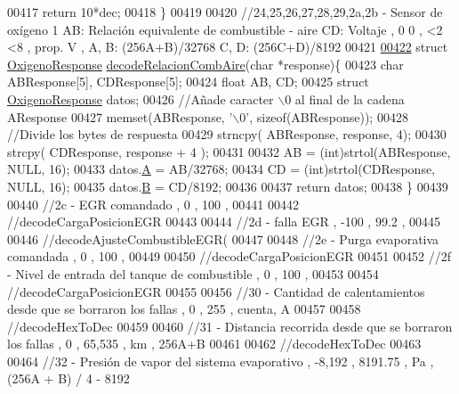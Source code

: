 \begin{DoxyCode}
{{{00417     \textcolor{keywordflow}{return} 10*dec;
00418 \}
00419 
00420 \textcolor{comment}{//24,25,26,27,28,29,2a,2b - Sensor de oxígeno 1 AB: Relación equivalente de combustible - aire CD: Voltaje
       , 0 0 , <2 <8 , prop. V , A, B: (256A+B)/32768 C, D: (256C+D)/8192   }
00421 
\hyperlink{decoders_8hpp_a363bd4f505969098be58a175f02b9b50}{00422} \textcolor{keyword}{struct }\hyperlink{structOxigenoResponse}{OxigenoResponse} \hyperlink{decoders_8cpp_a363bd4f505969098be58a175f02b9b50}{decodeRelacionCombAire}(char *response)\{
00423     \textcolor{keywordtype}{char} ABResponse[5], CDResponse[5];
00424     \textcolor{keywordtype}{float} AB, CD;
00425     \textcolor{keyword}{struct }\hyperlink{structOxigenoResponse}{OxigenoResponse} datos; 
00426     \textcolor{comment}{//Añade caracter \(\backslash\)0 al final de la cadena AResponse}
00427     memset(ABResponse, \textcolor{charliteral}{'\(\backslash\)0'}, \textcolor{keyword}{sizeof}(ABResponse));
00428     \textcolor{comment}{//Divide los bytes de respuesta}
00429     strncpy( ABResponse, response, 4);
00430     strcpy( CDResponse, response + 4 );
00431 
00432     AB = (int)strtol(ABResponse, NULL, 16);
00433     datos.\hyperlink{structOxigenoResponse_a068c403e5746226cf22bb020b4c786d3}{A} = AB/32768;
00434     CD = (int)strtol(CDResponse, NULL, 16);
00435     datos.\hyperlink{structOxigenoResponse_a96b19152dd001e19d1351e2d97f22736}{B} = CD/8192; 
00436     
00437     \textcolor{keywordflow}{return} datos;
00438 \}
00439 
00440 \textcolor{comment}{//2c - EGR comandado , 0 , 100 , %
00441 
00442 \textcolor{comment}{//decodeCargaPosicionEGR}
00443 
00444 \textcolor{comment}{//2d - falla EGR , -100 , 99.2 , %
00445 
00446 \textcolor{comment}{//decodeAjusteCombustibleEGR(}
00447 
00448 \textcolor{comment}{//2e - Purga evaporativa comandada , 0 , 100 , %
00449 
00450 \textcolor{comment}{//decodeCargaPosicionEGR}
00451 
00452 \textcolor{comment}{//2f - Nivel de entrada del tanque de combustible , 0 , 100 , %
00453 
00454 \textcolor{comment}{//decodeCargaPosicionEGR}
00455 
00456 \textcolor{comment}{//30 - Cantidad de calentamientos desde que se borraron los fallas , 0 , 255 , cuenta, A}
00457 
00458 \textcolor{comment}{//decodeHexToDec}
00459 
00460 \textcolor{comment}{//31 - Distancia recorrida desde que se borraron los fallas , 0 , 65,535 , km , 256A+B}
00461 
00462 \textcolor{comment}{//decodeHexToDec}
00463 
00464 \textcolor{comment}{//32 - Presión de vapor del sistema evaporativo , -8,192 , 8191.75 , Pa , (256A + B) / 4 - 8192 }
}}}}}}}
\end{DoxyCode}
